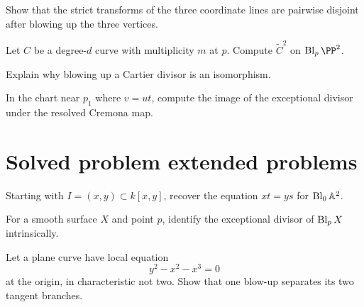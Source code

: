 \begin{exercise}\label{exr:vi45-21}
Show that the strict transforms of the three coordinate lines are pairwise disjoint after blowing up the three vertices.
\end{exercise}

\begin{exercise}\label{exr:vi45-22}
Let \(C\) be a degree-\(d\) curve with multiplicity \(m\) at \(p\).  Compute \(\widetilde C^2\) on \(\Bl_p\PP^2\).
\end{exercise}

\begin{exercise}\label{exr:vi45-23}
Explain why blowing up a Cartier divisor is an isomorphism.
\end{exercise}

\begin{exercise}\label{exr:vi45-24}
In the chart near \(p_1\) where \(v=ut\), compute the image of the exceptional divisor under the resolved Cremona map.
\end{exercise}

\ifdefined\IncludeExerciseHints

\fi
\ifdefined\IncludeExerciseSolutions

\fi

\section{Solved problem extended problems}

\begin{problem}\label{prob:vi45-01}
Starting with \(I=(x,y)\subset k[x,y]\), recover the equation \(xt=ys\) for \(\operatorname{Bl}_0\mathbb A^2\).
\end{problem}

\begin{problem}\label{prob:vi45-02}
For a smooth surface \(X\) and point \(p\), identify the exceptional divisor of \(\operatorname{Bl}_pX\) intrinsically.
\end{problem}

\begin{problem}\label{prob:vi45-03}
Let a plane curve have local equation
\[
  y^2-x^2-x^3=0
\]
at the origin, in characteristic not two.  Show that one blow-up separates its two tangent branches.
\end{problem}

